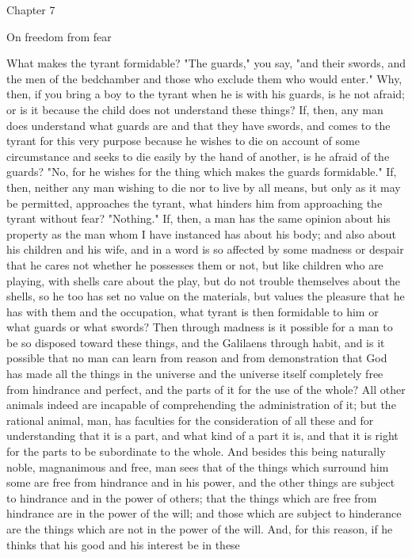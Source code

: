 \documentclass[a4paper]{article}
\begin{document}
Chapter 7

On freedom from fear

    What makes the tyrant formidable? "The guards," you say, "and their swords,
and the men of the bedchamber and those who exclude them who would enter." Why,
then, if you bring a boy to the tyrant when he is with his guards, is he not
afraid; or is it because the child does not understand these things? If, then,
any man does understand what guards are and that they have swords, and comes to
the tyrant for this very purpose because he wishes to die on account of some
circumstance and seeks to die easily by the hand of another, is he afraid of
the guards? "No, for he wishes for the thing which makes the guards
formidable." If, then, neither any man wishing to die nor to live by all means,
but only as it may be permitted, approaches the tyrant, what hinders him from
approaching the tyrant without fear? "Nothing." If, then, a man has the same
opinion about his property as the man whom I have instanced has about his body;
and also about his children and his wife, and in a word is so affected by some
madness or despair that he cares not whether he possesses them or not, but like
children who are playing, with shells care about the play, but do not trouble
themselves about the shells, so he too has set no value on the materials, but
values the pleasure that he has with them and the occupation, what tyrant is
then formidable to him or what guards or what swords?
    Then through madness is it possible for a man to be so disposed toward
these things, and the Galilaens through habit, and is it possible that no man
can learn from reason and from demonstration that God has made all the things
in the universe and the universe itself completely free from hindrance and
perfect, and the parts of it for the use of the whole? All other animals indeed
are incapable of comprehending the administration of it; but the rational
animal, man, has faculties for the consideration of all these and for
understanding that it is a part, and what kind of a part it is, and that it is
right for the parts to be subordinate to the whole. And besides this being
naturally noble, magnanimous and free, man sees that of the things which
surround him some are free from hindrance and in his power, and the other
things are subject to hindrance and in the power of others; that the things
which are free from hindrance are in the power of the will; and those which are
subject to hinderance are the things which are not in the power of the will.
And, for this reason, if he thinks that his good and his interest be in these
\end{document}
